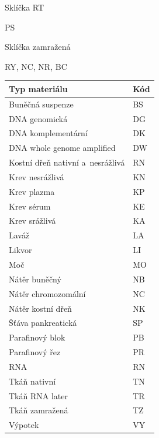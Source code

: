 \documentclass[11pt, final, oneside]{fithesis2}
\begin{document}
\begin{appendix}
\begin{multicols}{2}
\begin{compactitem}
	\item Sklíčka RT 
		\begin{compactitem}
			\item PS
		\end{compactitem}

	\item Sklíčka zamražená 
		\begin{compactitem}
			\item RY, NC, NR, BC
		\end{compactitem}
 \end{compactitem}

\end{multicols}


\begin{table}[h!] 
\centering
\begin{tabular}{l l}
\hline 
Typ materiálu & Kód \\
\hline \hline
Buněčná suspenze 									& BS \\
DNA genomická 										& DG \\
DNA komplementární 								& DK \\
DNA whole genome amplified 				& DW \\
Kostní dřeň nativní a~nesrážlivá 	& RN \\
Krev nesrážlivá 									& KN \\
Krev plazma 											& KP \\
Krev sérum 												& KE \\
Krev srážlivá 										& KA \\
Laváž 														& LA \\
Likvor 														& LI \\
Moč 															& MO \\
Nátěr buněčný 										& NB \\
Nátěr chromozomální 							& NC \\
Nátěr kostní dřeň 								& NK \\
Šťáva pankreatická  							& SP \\
Parafinový blok 									& PB \\
Parafinový řez 										& PR \\
RNA 															& RN \\
Tkáň nativní 											& TN \\
Tkáň RNA later 										& TR \\
Tkáň zamražená 										& TZ \\
Výpotek 													& VY \\


\end{tabular}
\end{table}
\end{appendix}
\end{document}
